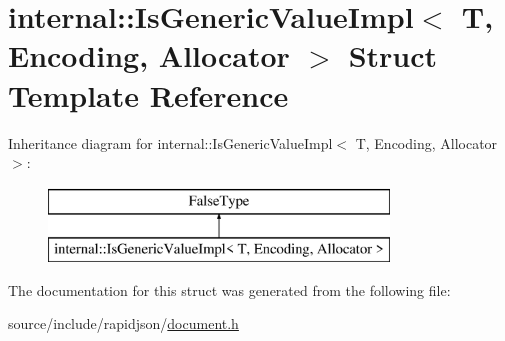 \hypertarget{structinternal_1_1_is_generic_value_impl}{}\section{internal\+:\+:Is\+Generic\+Value\+Impl$<$ T, Encoding, Allocator $>$ Struct Template Reference}
\label{structinternal_1_1_is_generic_value_impl}
Inheritance diagram for internal\+:\+:Is\+Generic\+Value\+Impl$<$ T, Encoding, Allocator $>$\+:\begin{figure}[H]
\begin{center}
\leavevmode
\includegraphics[height=2.000000cm]{structinternal_1_1_is_generic_value_impl}
\end{center}
\end{figure}


The documentation for this struct was generated from the following file\+:\begin{DoxyCompactItemize}
\item 
source/include/rapidjson/\hyperlink{document_8h}{document.\+h}\end{DoxyCompactItemize}
